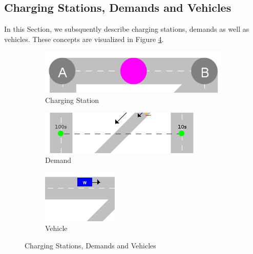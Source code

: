 \documentclass[graybox]{svmult}
\begin{document}
\noindent
\subsection{Charging Stations, Demands and Vehicles}
\label{sec:chargingstations-demands-vehicles}	
In this Section, we subsquently describe charging stations, demands as well as vehicles. These concepts are visualized in Figure \ref{fig:chargingstations-demands-vehicles}.
\vspace{4mm}

\begin{figure}
	\hfill
	\begin{subfigure}{.3\textwidth}
		\centering
		\includegraphics[scale=0.25]{../../concepts/charge-station.png}
		\caption{Charging Station}
		\label{fig:charging-station}	
	\end{subfigure}
	\hfill
	\begin{subfigure}{.3\textwidth}
		\centering
		\includegraphics[scale=0.4]{../../concepts/demand.png}
		\caption{Demand}
		\label{fig:demand}
	\end{subfigure}
	\hfill
	\begin{subfigure}{.3\textwidth}
		\centering
		\includegraphics[scale=0.6]{../../concepts/vehicle.png}
		\caption{Vehicle}
		\label{fig:vehicle}	
	\end{subfigure}

	\caption{Charging Stations, Demands and Vehicles}
	\label{fig:chargingstations-demands-vehicles}	
\end{figure}
\end{document}
